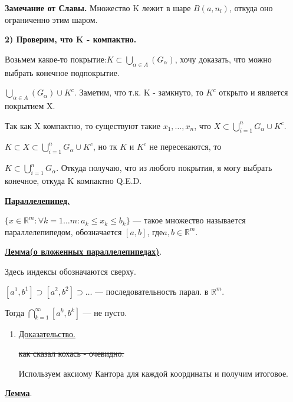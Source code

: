 \documentclass{article}
\newcommand{\deff}[1]{\underline{\textbf{#1}}}
\newcommand{\thmm}[1]{\underline{\textbf{#1}}}
\begin{document}
\begin{enumerate}
        \textbf{Замечание от Славы.} Множество K лежит в шаре $B(a,n_l)$, откуда  оно ограниченно этим шаром.
        
        \textbf{2) Проверим, что K - компактно.} 

        Возьмем какое-то покрытие:$K \subset \bigcup\limits_{\alpha \in A} (G_\alpha)$, хочу доказать, что можно выбрать конечное подпокрытие.
        
        $\bigcup\limits_{\alpha \in A} (G_\alpha) \cup K^c$. Заметим, что т.к. K - замкнуто, то $K^c$ открыто и является покрытием X.
        
        Так как X компактно, то существуют  такие $x_1,\ldots,x_n$, что $X \subset  \bigcup\limits_{i=1}^{n} G_{\alpha} \cup K^c$.

        $K \subset X \subset  \bigcup\limits_{i=1}^{n} G_{\alpha} \cup K^c$, но тк $K$ и $K^c$ не пересекаются, то
        
       $K \subset \bigcup\limits_{i=1}^{n} G_{\alpha}$.  Откуда получаю, что из любого покрытия, я могу выбрать конечное, откуда K компактно Q.E.D. 
\end{enumerate}
\deff{Параллелепипед.}

$\{x \in \mathbb{R}^m: \forall k = 1\ldots m: a_k\leq x_k \leq b_k\}$ --- такое множество называется параллелепипедом, обозначается
$[a,b]$, где$ a,b \in \mathbb{R}^m$. 

\deff{Лемма(о вложенных параллелепипедах)}.

Здесь индексы обозначаются сверху.


$[a^1,b^1]\supset [a^2,b^2]\supset \ldots$ --- последовательность парал. в $\mathbb{R}^m$.

Тогда $\bigcap\limits_{k=1}^{\infty} [a^k,b^k]$ --- не пусто.

\begin{enumerate}
        \item[] \uline{Доказательство.}
        
       \sout{как сказал кохась - очевидно.}

       Используем аксиому Кантора для каждой координаты и получим итоговое.
\end{enumerate}

\thmm{Лемма}.
\end{document}
